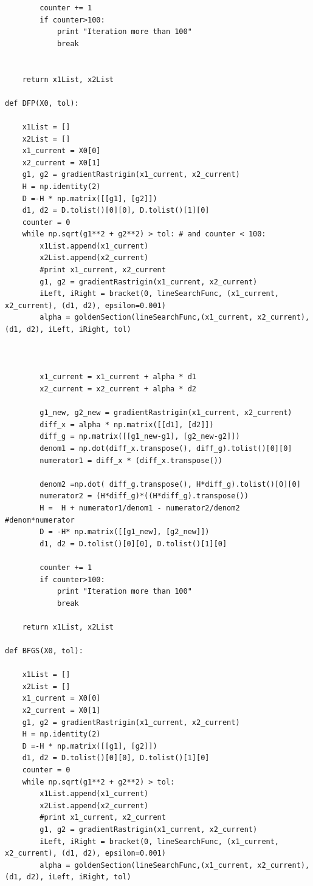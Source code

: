 \documentclass{article}
\begin{document}
\begin{lstlisting}
        counter += 1
        if counter>100:
            print "Iteration more than 100"
            break


    return x1List, x2List

def DFP(X0, tol):

    x1List = []
    x2List = []
    x1_current = X0[0]
    x2_current = X0[1]
    g1, g2 = gradientRastrigin(x1_current, x2_current)
    H = np.identity(2)
    D =-H * np.matrix([[g1], [g2]])
    d1, d2 = D.tolist()[0][0], D.tolist()[1][0]
    counter = 0
    while np.sqrt(g1**2 + g2**2) > tol: # and counter < 100:
        x1List.append(x1_current)
        x2List.append(x2_current)
        #print x1_current, x2_current
        g1, g2 = gradientRastrigin(x1_current, x2_current)
        iLeft, iRight = bracket(0, lineSearchFunc, (x1_current, x2_current), (d1, d2), epsilon=0.001)
        alpha = goldenSection(lineSearchFunc,(x1_current, x2_current),(d1, d2), iLeft, iRight, tol)



        x1_current = x1_current + alpha * d1
        x2_current = x2_current + alpha * d2

        g1_new, g2_new = gradientRastrigin(x1_current, x2_current)
        diff_x = alpha * np.matrix([[d1], [d2]])
        diff_g = np.matrix([[g1_new-g1], [g2_new-g2]])
        denom1 = np.dot(diff_x.transpose(), diff_g).tolist()[0][0]
        numerator1 = diff_x * (diff_x.transpose())

        denom2 =np.dot( diff_g.transpose(), H*diff_g).tolist()[0][0]
        numerator2 = (H*diff_g)*((H*diff_g).transpose())
        H =  H + numerator1/denom1 - numerator2/denom2  #denom*numerator
        D = -H* np.matrix([[g1_new], [g2_new]])
        d1, d2 = D.tolist()[0][0], D.tolist()[1][0]

        counter += 1
        if counter>100:
            print "Iteration more than 100"
            break

    return x1List, x2List

def BFGS(X0, tol):

    x1List = []
    x2List = []
    x1_current = X0[0]
    x2_current = X0[1]
    g1, g2 = gradientRastrigin(x1_current, x2_current)
    H = np.identity(2)
    D =-H * np.matrix([[g1], [g2]])
    d1, d2 = D.tolist()[0][0], D.tolist()[1][0]
    counter = 0
    while np.sqrt(g1**2 + g2**2) > tol:
        x1List.append(x1_current)
        x2List.append(x2_current)
        #print x1_current, x2_current
        g1, g2 = gradientRastrigin(x1_current, x2_current)
        iLeft, iRight = bracket(0, lineSearchFunc, (x1_current, x2_current), (d1, d2), epsilon=0.001)
        alpha = goldenSection(lineSearchFunc,(x1_current, x2_current),(d1, d2), iLeft, iRight, tol)




\end{lstlisting}
\end{document}
